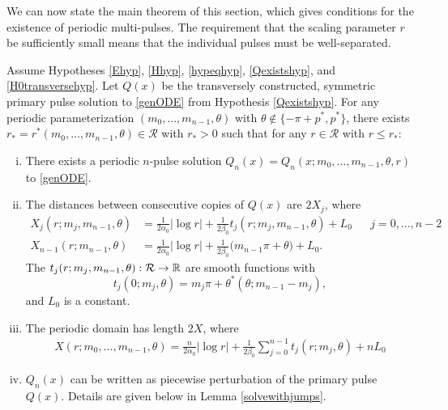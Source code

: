\documentclass[thesis.tex]{subfiles}
\begin{document}
We can now state the main theorem of this section, which gives conditions for the existence of periodic multi-pulses. The requirement that the scaling parameter $r$ be sufficiently small means that the individual pulses must be well-separated. 

\begin{theorem}\label{perexist}
Assume Hypotheses \ref{Ehyp}, \ref{Hhyp}, \ref{hypeqhyp}, \ref{Qexistshyp}, and \ref{H0transversehyp}. Let $Q(x)$ be the transversely constructed, symmetric primary pulse solution to \eqref{genODE} from Hypothesis \ref{Qexistshyp}. For any periodic parameterization $(m_0, \dots, m_{n-1}, \theta)$ with $\theta \notin \{-\pi + p^*, p^* \}$, there exists $r_* = r^*(m_0, \dots, m_{n-1}, \theta) \in \mathcal{R}$ with $r_* > 0$ such that for any $r \in \mathcal{R}$ with $r \leq r_*$:
\begin{enumerate}[(i)]
	\item There exists a periodic $n$-pulse solution $Q_n(x) = Q_n(x; m_0, \dots, m_{n-1}, \theta, r)$ to \eqref{genODE}.

	\item The distances between consecutive copies of $Q(x)$ are $2X_j$, where
	\begin{align}\label{Xj}
		X_j(r; m_j, m_{n-1},\theta) &= \frac{1}{2 \alpha_0} |\log r| + \frac{1}{2\beta_0} t_j(r; m_j,m_{n-1}, \theta) + L_0 && j = 0, \dots, n-2 \\
		X_{n-1}(r; m_{n-1}, \theta) &= \frac{1}{2 \alpha_0} |\log r| + \frac{1}{2 \beta_0}\big( m_{n-1}\pi + \theta \big) + L_0.
	\end{align}
	The $t_j(r; m_j, m_{n-1}, \theta): \mathcal{R} \rightarrow \mathbb{R}$ are smooth functions with 
	\[
	t_j(0; m_j, \theta) = m_j \pi + \theta^*(\theta; m_{n-1} - m_j),
	\]
	and $L_0$ is a constant.

	\item The periodic domain has length $2X$, where
	\begin{align}\label{Xdomain}
	X(r; m_0, \dots, m_{n-1}, \theta) = \frac{n}{2\alpha_0} |\log r| + \frac{1}{2\beta_0} \sum_{j=0}^{n-1} t_j(r; m_j, \theta) + n L_0
	\end{align}

	\item $Q_n(x)$ can be written as piecewise perturbation of the primary pulse $Q(x)$. Details are given below in Lemma \ref{solvewithjumps}.
\end{enumerate}
\end{theorem}
\end{document}
